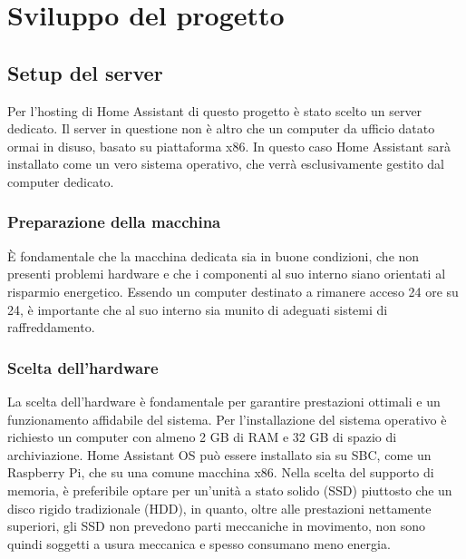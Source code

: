 \documentclass[11pt, a4paper]{article}
\begin{document}
\section{Sviluppo del progetto}

\subsection{Setup del server}
Per l'hosting di Home Assistant di questo progetto è stato scelto un server dedicato.
Il server in questione non è altro che un computer da ufficio datato ormai in disuso, basato su
piattaforma x86.
In questo caso Home Assistant sarà installato come un vero sistema operativo, che verrà esclusivamente
gestito dal computer dedicato.

\subsubsection{Preparazione della macchina}
È fondamentale che la macchina dedicata sia in buone condizioni, che non presenti problemi hardware e che
i componenti al suo interno siano orientati al risparmio energetico. Essendo un computer destinato
a rimanere acceso 24 ore su 24, è importante che al suo interno sia munito di adeguati sistemi di raffreddamento.

\subsubsection{Scelta dell'hardware}
La scelta dell'hardware è fondamentale per garantire prestazioni ottimali e un funzionamento affidabile del sistema.
Per l'installazione del sistema operativo è richiesto un computer con almeno 2 GB di RAM e 32 GB di spazio di archiviazione.
Home Assistant OS può essere installato sia su SBC, come un Raspberry Pi, che su una comune macchina x86.
Nella scelta del supporto di memoria, è preferibile optare per un'unità a stato solido (SSD) piuttosto che un disco rigido tradizionale (HDD),
in quanto, oltre alle prestazioni nettamente superiori, gli SSD non prevedono parti meccaniche in movimento, non sono quindi
soggetti a usura meccanica e spesso consumano meno energia.
\end{document}

